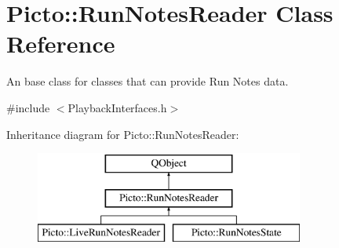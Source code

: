 \hypertarget{class_picto_1_1_run_notes_reader}{\section{Picto\-:\-:Run\-Notes\-Reader Class Reference}
\label{class_picto_1_1_run_notes_reader}
}


An base class for classes that can provide Run Notes data.  




{\ttfamily \#include $<$Playback\-Interfaces.\-h$>$}

Inheritance diagram for Picto\-:\-:Run\-Notes\-Reader\-:\begin{figure}[H]
\begin{center}
\leavevmode
\includegraphics[height=3.000000cm]{class_picto_1_1_run_notes_reader}
\end{center}
\end{figure}
